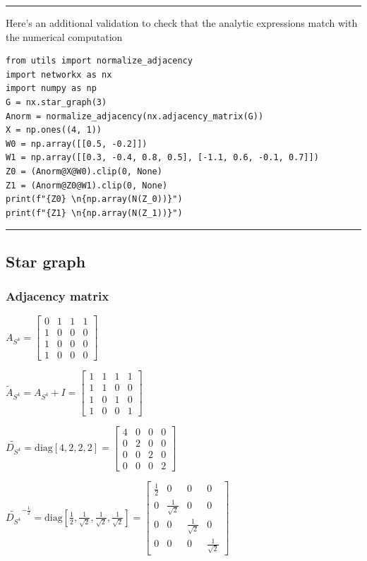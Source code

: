 \documentclass[a4paper]{article}
\begin{document}
\hrule
Here's an additional validation to check that the analytic expressions match with the numerical computation
\begin{verbatim}
from utils import normalize_adjacency
import networkx as nx
import numpy as np
G = nx.star_graph(3)
Anorm = normalize_adjacency(nx.adjacency_matrix(G))
X = np.ones((4, 1))
W0 = np.array([[0.5, -0.2]])
W1 = np.array([[0.3, -0.4, 0.8, 0.5], [-1.1, 0.6, -0.1, 0.7]])
Z0 = (Anorm@X@W0).clip(0, None)
Z1 = (Anorm@Z0@W1).clip(0, None)
print(f"{Z0} \n{np.array(N(Z_0))}")
print(f"{Z1} \n{np.array(N(Z_1))}")
\end{verbatim}
\hrule

\break
\subsection*{Star graph}

\subsubsection*{Adjacency matrix}
$ A_{S^4} = \begin{bmatrix}
    0  &  1  &  1  &  1 \\
    1  &  0  &  0  &  0 \\
    1  &  0  &  0  &  0 \\
    1  &  0  &  0  &  0 
\end{bmatrix}
$

$\tilde{A}_{S^4} = A_{S^4} + I = \begin{bmatrix}
    1  &  1  &  1  &  1 \\
    1  &  1  &  0  &  0 \\
    1  &  0  &  1  &  0 \\
    1  &  0  &  0  &  1 
  \end{bmatrix}
$

$ \tilde{D_{S^4}} = \text{diag}[4, 2, 2, 2] = \begin{bmatrix}
    4  &  0  &  0  &  0 \\
    0  &  2  &  0  &  0 \\
    0  &  0  &  2  &  0 \\
    0  &  0  &  0  &  2 
\end{bmatrix}$


$\tilde{D_{S^4}}^{-\frac{1}{2}} = \text{diag}[\frac{1}{2}, \frac{1}{\sqrt{2}}, \frac{1}{\sqrt{2}}, \frac{1}{\sqrt{2}}] = 
\begin{bmatrix}
    \frac{1}{2}  &  0  &  0  &  0 \\
    0  &  \frac{1}{\sqrt{2}}  &  0  &  0 \\
    0  &  0  &  \frac{1}{\sqrt{2}}  &  0 \\
    0  &  0  &  0  &  \frac{1}{\sqrt{2}} 
\end{bmatrix}$
\end{document}
